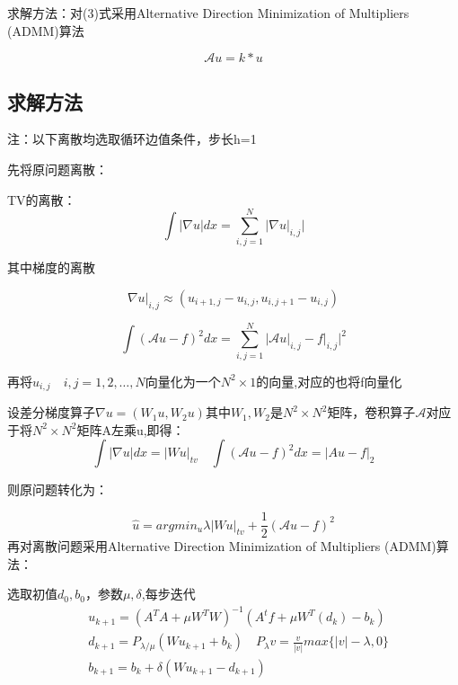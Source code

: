 \documentclass[withoutpreface,bwprint]{cumcmthesis}
\begin{document}
求解方法：对(3)式采用Alternative Direction Minimization of Multipliers (ADMM)算法

\begin{equation}
\mathcal{A}u=k\ast u
\end{equation}
\subsection{求解方法}

注：以下离散均选取循环边值条件，步长h=1

先将原问题离散：

TV的离散：
\begin{equation}
\int \lvert \nabla u\rvert dx=\sum_{i,j=1}^N\lvert \left.\nabla u\right|_{i,j}\rvert
\end{equation}

其中梯度的离散

\begin{equation}
\left.\nabla u\right|_{i,j}\approx (u_{i+1,j}-u_{i,j},u_{i,j+1}-u_{i,j})
\end{equation}

\begin{equation}
\int (\mathcal{A}u-f)^{2}dx=\sum_{i,j=1}^N\lvert \mathcal{A}u\rvert_{i,j}-f\rvert_{i,j} \rvert^{2}
\end{equation}

再将$u_{i,j}\quad i,j=1,2,\dots,N$向量化为一个$N^2\times 1$的向量,对应的也将f向量化

设差分梯度算子$\nabla u=(W_{1}u,W_{2}u)$其中$W_{1},W_{2}$是$N^2\times N^2$矩阵，卷积算子$\mathcal{A}$对应于将$N^2\times N^2$矩阵A左乘u,即得：
\begin{equation}
\int \lvert \nabla u\rvert dx =\lvert Wu\rvert_{tv} \quad \int (\mathcal{A}u-f)^{2}dx=\lvert Au-f\rvert_{2}
\end{equation}

则原问题转化为：

\begin{equation}
\hat{u}=argmin_{u}\lambda \lvert Wu\rvert_{tv}+\frac{1}{2}(\mathcal{A}u-f)^{2}
\end{equation}
再对离散问题采用Alternative Direction Minimization of Multipliers (ADMM)算法：

选取初值$d_{0},b_{0}$，参数$\mu ,\delta$,每步迭代
\begin{equation}
\begin{split}
&u_{k+1}=(A^TA+\mu W^TW)^{-1}(A^tf+\mu W^T(d_{k})-b_{k})\\
&d_{k+1}=P_{\lambda /\mu}(Wu_{k+1}+b_{k}) \quad P_{\lambda}{v}=\frac{v}{\lvert v\rvert}max\{ \lvert v\rvert-\lambda,0\}\\
&b_{k+1}=b_{k}+\delta(Wu_{k+1}-d_{k+1})
\end{split}
\end{equation}
\end{document}
